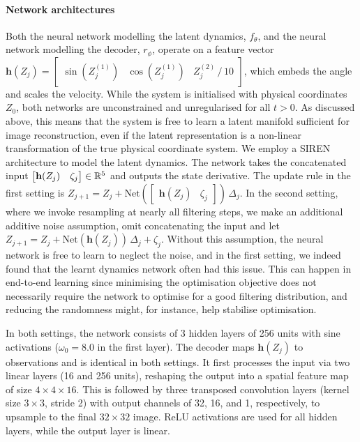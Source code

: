 \documentclass{article}
\begin{document}
\paragraph{Network architectures}
Both the neural network modelling the latent dynamics, $f_\theta$, and the neural network modelling the decoder, $r_\phi$, operate on a feature vector $\mathbf{h}(Z_j) = \begin{bmatrix} \sin(Z_j^{(1)}) & \cos(Z_j^{(1)}) & Z_j^{(2)} \, / \, 10 \end{bmatrix}$, which embeds the angle and scales the velocity. 
While the system is initialised with physical coordinates $Z_0$, both networks are unconstrained and unregularised for all $t>0$. 
As discussed above, this means that the system is free to learn a latent manifold sufficient for image reconstruction, even if the latent representation is a non-linear transformation of the true physical coordinate system. 
We employ a SIREN \citep{Sitzmann2019siren} architecture to model the latent dynamics. 
The network takes the concatenated input $\begin{bmatrix} \mathbf{h}(Z_j) & \zeta_j \end{bmatrix} \in \mathbb{R}^5$ and outputs the state derivative. 
The update rule in the first setting is $Z_{j+1} = Z_j + \mathrm{Net}(\begin{bmatrix} \mathbf{h}(Z_j) & \zeta_j \end{bmatrix}) \, \Delta_j$. In the second setting, where we invoke resampling at nearly all filtering steps, we make an additional additive noise assumption, omit concatenating the input and let $Z_{j+1} = Z_j + \mathrm{Net}(\mathbf{h}(Z_j))\,\Delta_j + \zeta_j$. Without this assumption, the neural network is free to learn to neglect the noise, and in the first setting, we indeed found that the learnt dynamics network often had this issue. This can happen in end-to-end learning since minimising the optimisation objective does not necessarily require the network to optimise for a good filtering distribution, and reducing the randomness might, for instance, help stabilise optimisation.

In both settings, the network consists of 3 hidden layers of 256 units with sine activations ($\omega_0=8.0$ in the first layer). The decoder maps $\mathbf{h}(Z_j)$ to observations and is identical in both settings. It first processes the input via two linear layers (16 and 256 units), reshaping the output into a spatial feature map of size $4 \times 4 \times 16$. 
This is followed by three transposed convolution layers (kernel size $3 \times 3$, stride 2) with output channels of 32, 16, and 1, respectively, to upsample to the final $32 \times 32$ image. 
ReLU activations are used for all hidden layers, while the output layer is linear.
\end{document}
